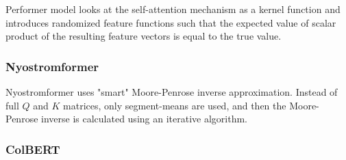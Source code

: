 Performer model \citep{performer} looks at the self-attention mechanism as a kernel function and introduces randomized feature functions such that the expected value of scalar product %
of the resulting feature vectors is equal to the true value.

\subsubsection{Nyostromformer}

Nyostromformer \citep{nystrom} uses "smart" Moore-Penrose inverse approximation. Instead of full $Q$ and $K$ matrices, only segment-means are used, and then the Moore-Penrose inverse is calculated using an iterative algorithm.

\subsubsection{ColBERT}


